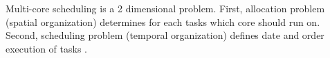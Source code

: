 \documentclass[conference]{IEEEtran}
\begin{document}

Multi-core scheduling is a 2 dimensional problem. First, allocation problem (spatial organization) determines for each tasks which core should run on. Second, scheduling problem (temporal organization) defines date and order execution of tasks \cite{AbdallahGB24}.
\end{document}
